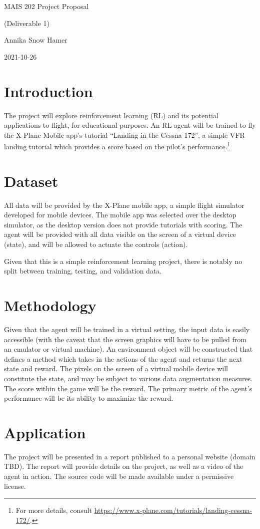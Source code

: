 \documentclass{article}
\begin{document}
\begin{center}
\Large MAIS 202 Project Proposal

\normalsize (Deliverable 1)

Annika Snow Hamer

2021-10-26
\end{center}

\section{Introduction}

The project will explore reinforcement learning (RL) and its potential applications to flight, for educational purposes. An RL agent will be trained to fly the X-Plane Mobile app's tutorial ``Landing in the Cessna 172'', a simple VFR landing tutorial which provides a score based on the pilot's performance.\footnote{For more details, consult \url{https://www.x-plane.com/tutorials/landing-cessna-172/}.}

\section{Dataset}

All data will be provided by the X-Plane mobile app, a simple flight simulator developed for mobile devices. The mobile app was selected over the desktop simulator, as the desktop version does not provide tutorials with scoring. The agent will be provided with all data visible on the screen of a virtual device (state), and will be allowed to actuate the controls (action).

Given that this is a simple reinforcement learning project, there is notably no split between training, testing, and validation data.

\section{Methodology}

Given that the agent will be trained in a virtual setting, the input data is easily accessible (with the caveat that the screen graphics will have to be pulled from an emulator or virtual machine). An environment object will be constructed that defines a method which takes in the actions of the agent and returns the next state and reward. The pixels on the screen of a virtual mobile device will constitute the state, and may be subject to various data augmentation measures. The score within the game will be the reward. The primary metric of the agent's performance will be its ability to maximize the reward.

\section{Application}

The project will be presented in a report published to a personal website (domain TBD). The report will provide details on the project, as well as a video of the agent in action. The source code will be made available under a permissive license.
\end{document}
